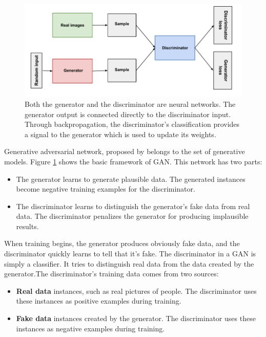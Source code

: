 \documentclass[conference]{IEEEtran}
\begin{document}
\begin{figure}
    \centering
    \includegraphics[width=\columnwidth]{images/gan.png}
    \caption{Both the generator and the discriminator are neural networks. The generator output is connected directly to the discriminator input. Through backpropagation, the discriminator's classification provides a signal to the generator which is used to update its weights.}
    \label{fig:gan.png}
\end{figure}
    Generative adversarial network, proposed by \citeauthor{goodfellow2014gan} \cite{goodfellow2014gan} belongs to the set of generative models. Figure \ref{fig:gan.png} shows the basic framework of GAN. This network has two parts:
\begin{itemize}
  \item The generator learns to generate plausible data. The generated instances become negative training examples for the discriminator.
  \item The discriminator learns to distinguish the generator's fake data from real data. The discriminator penalizes the generator for producing implausible results.
\end{itemize}

    When training begins, the generator produces obviously fake data, and the discriminator quickly learns to tell that it's fake. The discriminator in a GAN is simply a classifier. It tries to distinguish real data from the data created by the generator.The discriminator's training data comes from two sources:
\begin{itemize}
  \item \textbf{Real data} instances, such as real pictures of people. The discriminator uses these instances as positive examples during training.
  \item \textbf{Fake data} instances created by the generator. The discriminator uses these instances as negative examples during training.
\end{itemize}
 
\end{document}
